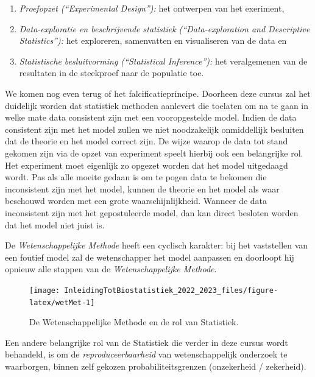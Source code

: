 \documentclass[
  12pt,dutch,coursenotes]{book}
\providecommand{\tightlist}{%
  \setlength{\itemsep}{0pt}\setlength{\parskip}{0pt}}
\begin{document}
\begin{itemize}
  \begin{enumerate}
  \def\labelenumi{\arabic{enumi}.}
  \tightlist
  \item
    \emph{Proefopzet (``Experimental Design''):} het ontwerpen van het exeriment,
  \item
    \emph{Data-exploratie en beschrijvende statistiek (``Data-exploration and Descriptive Statistics''):} het exploreren, samenvatten en visualiseren van de data en
  \item
    \emph{Statistische besluitvorming (``Statistical Inference''):} het veralgemenen van de resultaten in de steekproef naar de populatie toe.
  \end{enumerate}
\end{itemize}

We komen nog even terug of het falcificatieprincipe. Doorheen deze cursus zal het duidelijk worden dat statistiek methoden aanlevert die toelaten om na te gaan in welke mate data consistent zijn met een vooropgestelde model. Indien de data consistent zijn met het model zullen we niet noodzakelijk onmiddellijk besluiten dat de theorie en het model correct zijn. De wijze waarop de data tot stand gekomen zijn via de opzet van experiment speelt hierbij ook een belangrijke rol. Het experiment moet eigenlijk zo opgezet worden dat het model uitgedaagd wordt. Pas als alle moeite gedaan is om te pogen data te bekomen die inconsistent zijn met het model, kunnen de theorie en het model als waar beschouwd worden met een grote waarschijnlijkheid. Wanneer de data inconsistent zijn met het gepostuleerde model, dan kan direct besloten worden dat het model niet juist is.

De \emph{Wetenschappelijke Methode} heeft een cyclisch karakter: bij het vaststellen van een foutief model zal de wetenschapper het model aanpassen en doorloopt hij opnieuw alle stappen van de \emph{Wetenschappelijke Methode}.

\begin{figure}

{\centering \texttt{[image: InleidingTotBiostatistiek\_2022\_2023\_files/figure-latex/wetMet-1]} 

}

\caption{De Wetenschappelijke Methode en de rol van Statistiek.}\label{fig:wetMet}
\end{figure}

Een andere belangrijke rol van de Statistiek die verder in deze cursus wordt behandeld, is om de \emph{reproduceerbaarheid} van wetenschappelijk onderzoek te waarborgen, binnen zelf gekozen probabiliteitsgrenzen (onzekerheid / zekerheid).
\end{document}
